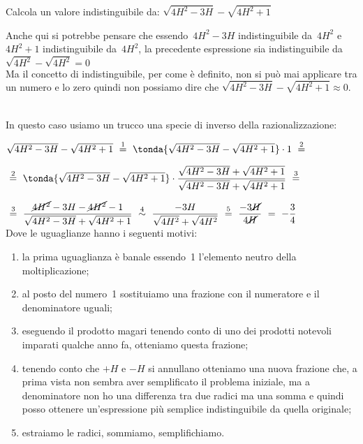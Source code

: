 \begin{esempio}
Calcola un valore indistinguibile da:
\(\sqrt{4H^2 -3H} - \sqrt{4H^2 +1}\)

\begin{osservazione}
 Anche qui si potrebbe pensare che essendo~\(4H^2 -3H\) indistinguibile 
da~\(4H^2\) e~\(4H^2 +1\) indistinguibile da~\(4H^2\), la precedente 
espressione sia indistinguibile da \\
\(\sqrt{4H^2} - \sqrt{4H^2} = 0\)\\
Ma il concetto di indistinguibile, per come è definito, non si può mai 
applicare tra un numero e lo zero quindi non possiamo dire che 
\(\sqrt{4H^2 -3H} - \sqrt{4H^2 +1} \approx 0\).
\end{osservazione}\\

In questo caso usiamo un trucco una specie di inverso della 
razionalizzazione:

\(\sqrt{4H^2 -3H} - \sqrt{4H^2 +1}
~ \stackrel{1}{=} ~
   \tonda{\sqrt{4H^2 -3H} - \sqrt{4H^2 +1}} \cdot 1 
~ \stackrel{2}{=} ~\)

\(~ \stackrel{2}{=} ~\tonda{\sqrt{4H^2 -3H}-\sqrt{4H^2 +1}} \cdot 
   \dfrac{\sqrt{4H^2 -3H}+\sqrt{4H^2 +1}}{\sqrt{4H^2 -3H}+\sqrt{4H^2+1}}
~ \stackrel{3}{=} ~\)

\(~ \stackrel{3}{=} ~
   \dfrac{\cancel{4H^2} -3H - \cancel{4H^2} -1}
         {\sqrt{4H^2 -3H}+\sqrt{4H^2+1}}
~ \stackrel{4}{\sim} ~
   \dfrac{-3H}{\sqrt{4H^2} + \sqrt{4H^2}}
~ \stackrel{5}{=} ~
   \dfrac{-3\cancel{H}}{4\cancel{H}}
~ \stackrel{}{=} ~
   -\dfrac{3}{4}\)\\

Dove le uguaglianze hanno i seguenti motivi:
\begin{enumerate} [nosep]
 \item la prima uguaglianza è banale essendo~1 l'elemento 
neutro della moltiplicazione; 
 \item al posto del numero~1 sostituiamo una frazione con 
il numeratore e il denominatore uguali; 
 \item eseguendo il prodotto magari tenendo conto di uno 
dei prodotti notevoli imparati qualche anno fa, otteniamo questa 
frazione;
 \item tenendo conto che \(+H\) e \(-H\) si annullano 
otteniamo una nuova frazione che, a prima vista non sembra 
aver semplificato il problema iniziale, 
ma a denominatore non ho una differenza tra due radici 
ma una somma e quindi posso ottenere un'espressione più semplice 
indistinguibile da quella originale;
 \item estraiamo le radici, sommiamo, semplifichiamo.
\end{enumerate}
\end{esempio}

